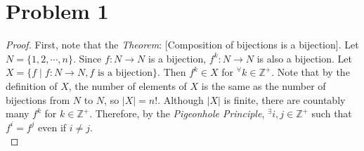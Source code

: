 \section*{Problem 1}
	\begin{proof}
		First, note that the \textit{Theorem}: [Composition of bijections is a bijection]. Let $N = \{1, 2, \cdots, n\}$. Since $f: N \to N$ is a bijection, $f^k: N \to N$ is also a bijection. Let $X = \{f\mid f: N \to N, f\mbox{ is a bijection}\}$. Then $f^k \in X$ for $^\forall k \in \mathbb{Z}^+$. Note that by the definition of $X$, the number of elements of $X$ is the same as the number of bijections from $N$ to $N$, so $|X| = n!$. Although $|X|$ is finite, there are countably many $f^k$ for $k \in \mathbb{Z}^+$. Therefore, by the \textit{Pigeonhole Principle}, $^\exists i, j \in \mathbb{Z}^+$ such that $f^i = f^j$ even if $i \neq j$.\\
	\end{proof}